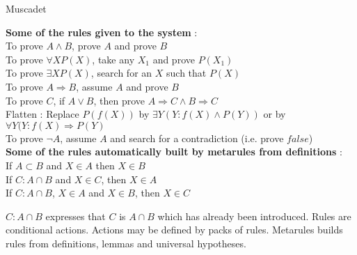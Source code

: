 \calculusAcronym{\Muscadet}




\maketitle

\begin{entry}{Muscadet}  

\begin{calculus}

\textbf {Some of the rules given to the system} :\\
To prove $A\land B$, prove $A$ and prove $B$\\
To prove $\forall X P(X)$, take any $X_1$ and prove $P(X_1)$\\
To prove $\exists X P(X)$, search for an $X$ such that $P(X)$\\
To prove $A \Rightarrow B$, assume $A$ and prove $B$ \\
To prove $C$, if $A \lor B$, then prove $A \Rightarrow C \land B \Rightarrow C$\\
Flatten : Replace $P(f(X))$ by $\exists Y(Y:f(X) \land P(Y))$ or by $\forall Y (Y:f(X) \Rightarrow P(Y)$\\
To prove $\neg A$, assume $A$ and search for a contradiction (i.e. prove $false$)
\\
\textbf {Some of the rules automatically built by metarules from  definitions} :\\
If $A \subset B$ and $X \in A$ then $X \in B$\\
If $C:A \cap B$ and $X \in C$, then $X \in A$ \\
If $C : A \cap B$, $X \in A$ and $X \in B$, then $X \in C$
\end{calculus}

\begin{clarifications}
$C:A \cap B$ expresses that $C$ is 
$A \cap B$ which has already been introduced.
Rules are conditional actions. Actions may be defined by packs of rules. 
Metarules builds rules from definitions, lemmas and universal hypotheses. 
\end{clarifications}


\end{entry}
